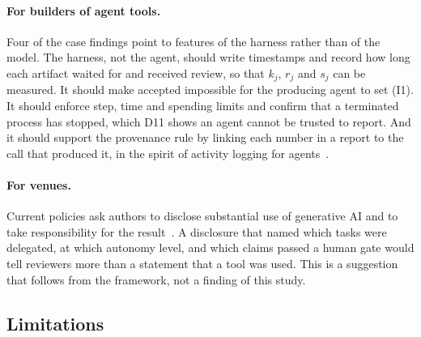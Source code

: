 \paragraph{For builders of agent tools.} Four of the case findings point to features
of the harness rather than of the model. The harness, not the agent, should write
timestamps and record how long each artifact waited for and received review, so that
$k_j$, $r_j$ and $s_j$ can be measured. It should make \textsf{accepted} impossible for the
producing agent to set (I1). It should enforce step, time and spending limits and confirm
that a terminated process has stopped, which D11 shows an agent cannot be trusted to
report. And it should support the provenance rule by linking each number in a report to
the call that produced it, in the spirit of activity logging for
agents~\cite{chan2024visibility}.

\paragraph{For venues.} Current policies ask authors to disclose substantial use of
generative AI and to take responsibility for the
result~\cite{arxiv2025genai,nature2023tools,ec2025living}. A disclosure that named which
tasks were delegated, at which autonomy level, and which claims passed a human gate would
tell reviewers more than a statement that a tool was used. This is a suggestion that
follows from the framework, not a finding of this study.

\subsection{Limitations}
\label{sec:limitations}

